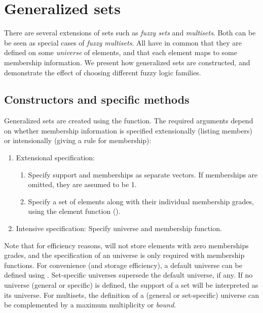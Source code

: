 \documentclass[article]{jss}
\newcommand{\codefun}[1]{\code{#1()}}
\begin{document}
\section{Generalized sets}
\label{sec:gsets}

There are several extensions of sets such as \emph{fuzzy sets}
and \emph{multisets}. Both can be be seen as special cases of
\emph{fuzzy multisets}. All have in common that they are defined on some
\emph{universe} of elements, and that each element maps to some
membership information.
We present how generalized sets are constructed, and
demonstrate the effect of choosing different fuzzy logic families.

\subsection{Constructors and specific methods}

Generalized sets are created using the \codefun{gset} function. The
required arguments depend on whether membership information is specified
extensionally (listing members) or intensionally
(giving a rule for membership):

\begin{enumerate}
\item Extensional specification:
  \begin{enumerate}[a]
  \item Specify support and memberships as separate vectors. If
    memberships are omitted, they are assumed to be 1.
  \item Specify a set of elements along with their individual membership
    grades, using the element function (\codefun{e}).
  \end{enumerate}
\item Intensive specification: Specify universe and membership function.
\end{enumerate}

\noindent Note that for efficiency reasons, \codefun{gset} will not
store elements with zero memberships grades, and the specification of an
universe is only required with membership functions.
For convenience (and storage efficiency), a
default universe can be defined using \codefun{sets\_options}.
Set-specific universes supersede the default universe, if any.
If no universe (general or specific) is defined, the support of a set will be
interpreted as its universe. For multisets, the definition of a
(general or set-specific) universe can be complemented by a maximum
multiplicity or \emph{bound}.
\end{document}
